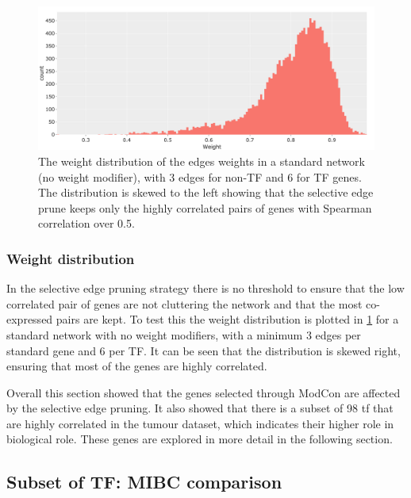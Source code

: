 \begin{figure}[!b]   
\centering
\includegraphics[width=1.0\textwidth,height=1.0\textheight,keepaspectratio]{Sections/Network_I/Resources/selective_pruning/weight_distrib.png}
  \caption[Weight distribution]{The weight distribution of the edges weights in a standard network (no weight modifier), with 3 edges for non-TF and 6 for TF genes. The distribution is skewed to the left showing that the selective edge prune keeps only the highly correlated pairs of genes with Spearman correlation over 0.5. }
\label{fig:N_I:weight_distrib}
\end{figure}

\subsubsection*{Weight distribution}

In the selective edge pruning strategy there is no threshold to ensure that the low correlated pair of genes are not cluttering the network and that the most co-expressed pairs are kept. To test this the weight distribution is plotted in \cref{fig:N_I:weight_distrib} for a standard network with no weight modifiers, with a minimum 3 edges per standard gene and 6 per TF. It can be seen that the distribution is skewed right, ensuring that most of the genes are highly correlated.


Overall this section showed that the genes selected through ModCon are affected by the selective edge pruning. It also showed that there is a subset of 98 \acrlong{tf} that are highly correlated in the tumour dataset, which indicates their higher role in biological role. These genes are explored in more detail in the following section.


\subsection{Subset of TF: MIBC comparison} \label{s:N_I:sel_tfs_mibc}

